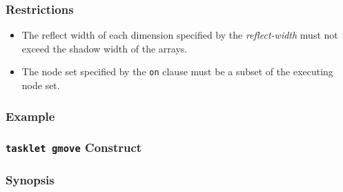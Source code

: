 
\subsubsection*{Restrictions}

\begin{itemize}
 \item The reflect width of each dimension specified by the {\it
       reflect-width} must not exceed the shadow width of the arrays.
 \item The node set specified by the {\tt on} clause must be a subset of the
       executing node set.
\end{itemize}

\subsubsection*{Example}



%
%

\subsubsection{{\tt tasklet gmove} Construct}

\subsubsection*{Synopsis}

